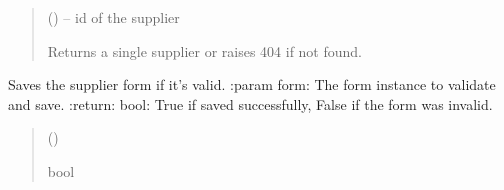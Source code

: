 \documentclass[a4paper,11pt,spanish]{sphinxmanual}
\begin{document}
\begin{fulllineitems}
\label{\detokenize{api/supplier/supplier.services:supplier.services.get_supplier_or_404}}
\pysigstartsignatures
\pysiglinewithargsret
{}
{}
{}
\pysigstopsignatures\begin{quote}\begin{description}
\sphinxAtStartPar
{} () – id of the supplier

\sphinxAtStartPar
Returns a single supplier or raises 404 if not found.

\sphinxAtStartPar
{\hyperref[\detokenize{api/supplier/supplier.models:supplier.models.Supplier}]{}}

\end{description}\end{quote}

\end{fulllineitems}


\begin{fulllineitems}
\label{\detokenize{api/supplier/supplier.services:supplier.services.save_supplier_form}}
\pysigstartsignatures
\pysiglinewithargsret
{}
{}
{}
\pysigstopsignatures
\sphinxAtStartPar
Saves the supplier form if it’s valid.
:param form:  The form instance to validate and save.
:return: bool: True if saved successfully, False if the form was invalid.
\begin{quote}\begin{description}
\sphinxAtStartPar
{} ({\hyperref[\detokenize{api/supplier/supplier.forms:supplier.forms.SupplierForm}]{}})

\sphinxAtStartPar
bool

\end{description}\end{quote}

\end{fulllineitems}
\end{document}

